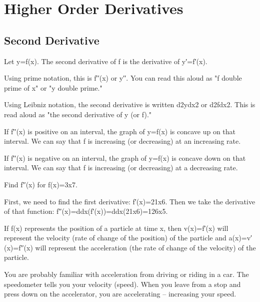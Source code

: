 \section{Higher Order Derivatives}
\label{sec:higherorder}

\subsection{Second Derivative}
\label{ssec:second-deriv}

Let y=f(x). The second derivative of f is the derivative of y′=f′(x).

Using prime notation, this is f′′(x) or y′′. You can read this aloud as "f double prime of x" or "y double prime."

Using Leibniz notation, the second derivative is written d2ydx2 or d2fdx2. This is read aloud as "the second derivative of y (or f)."

If f′′(x) is positive on an interval, the graph of y=f(x) is concave up on that interval. We can say that f is increasing (or decreasing) at an increasing rate.

If f′′(x) is negative on an interval, the graph of y=f(x) is concave down on that interval. We can say that f is increasing (or decreasing) at a decreasing rate.

\begin{example}
Find f′′(x) for f(x)=3x7.

\begin{solution} First, we need to find the first derivative:
f′(x)=21x6.
Then we take the derivative of that function:
f′′(x)=ddx(f′(x))=ddx(21x6)=126x5.
\end{solution}\end{example}

If f(x) represents the position of a particle at time x, then v(x)=f′(x) will represent the velocity (rate of change of the position) of the particle and a(x)=v′(x)=f′′(x) will represent the acceleration (the rate of change of the velocity) of the particle.

You are probably familiar with acceleration from driving or riding in a car. The speedometer tells you your velocity (speed). When you leave from a stop and press down on the accelerator, you are accelerating – increasing your speed.

